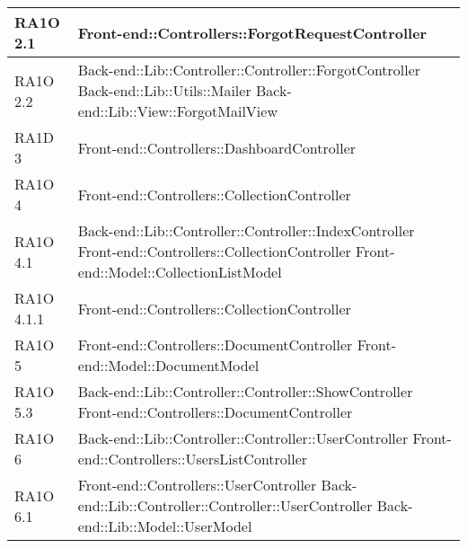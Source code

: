 \begin{center}
\begin{longtable}{ | p{3cm} | p{11cm} | }
    RA1O 2.1 & Front-end::Controllers::ForgotRequestController \newline  \\ \hline   
       
    RA1O 2.2 & Back-end::Lib::Controller::Controller::ForgotController \newline
    			  			Back-end::Lib::Utils::Mailer \newline
    			  			Back-end::Lib::View::ForgotMailView \newline  \\ \hline     
    			   
     
    RA1D 3 & Front-end::Controllers::DashboardController \newline  \\ \hline  
        
    RA1O 4 & Front-end::Controllers::CollectionController \newline  \\ \hline   
       
    RA1O 4.1 & Back-end::Lib::Controller::Controller::IndexController \newline Front-end::Controllers::CollectionController \newline Front-end::Model::CollectionListModel \newline  \\ \hline   
       
    RA1O 4.1.1 & Front-end::Controllers::CollectionController \newline  \\ \hline 
         
    RA1O 5 & Front-end::Controllers::DocumentController \newline
    			 Front-end::Model::DocumentModel \newline  \\ \hline    
           
    RA1O 5.3 & Back-end::Lib::Controller::Controller::ShowController \newline
    			 Front-end::Controllers::DocumentController\newline  \\ \hline      
    
    RA1O 6 & Back-end::Lib::Controller::Controller::UserController \newline Front-end::Controllers::UsersListController  \\ \hline  
        
    RA1O 6.1 & Front-end::Controllers::UserController \newline Back-end::Lib::Controller::Controller::UserController \newline Back-end::Lib::Model::UserModel \\ \hline   
       

\end{longtable}
\end{center}
